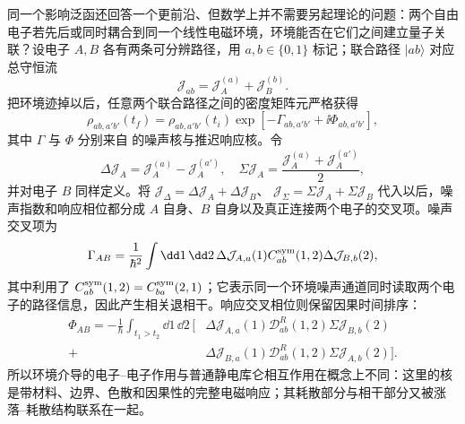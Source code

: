 同一个影响泛函还回答一个更前沿、但数学上并不需要另起理论的问题：两个自由电子若先后或同时耦合到同一个线性电磁环境，环境能否在它们之间建立量子关联？设电子 $A,B$ 各有两条可分辨路径，用 $a,b\in\{0,1\}$ 标记；联合路径 $|ab\rangle$ 对应总守恒流
\begin{equation*}
\mathcal J_{ab}=\mathcal J_A^{(a)}+\mathcal J_B^{(b)}.
\end{equation*}
把环境迹掉以后，任意两个联合路径之间的密度矩阵元严格获得
\begin{equation}
{
\rho_{ab,a'b'}(t_f)
=\rho_{ab,a'b'}(t_i)
\exp\!\left[-\Gamma_{ab,a'b'}+\ii\Phi_{ab,a'b'}\right],}
\label{eq:two_electron_environment_influence_matrix}
\end{equation}
其中 $\Gamma$ 与 $\Phi$ 分别来自 的噪声核与推迟响应核。令
\[
\Delta\mathcal J_A=\mathcal J_A^{(a)}-\mathcal J_A^{(a')},
\quad
\Sigma\mathcal J_A=\frac{\mathcal J_A^{(a)}+\mathcal J_A^{(a')}}2,
\]
并对电子 $B$ 同样定义。将
$\mathcal J_\Delta=\Delta\mathcal J_A+\Delta\mathcal J_B$、
$\mathcal J_\Sigma=\Sigma\mathcal J_A+\Sigma\mathcal J_B$
代入以后，噪声指数和响应相位都分成 $A$ 自身、$B$ 自身以及真正连接两个电子的交叉项。噪声交叉项为
\begin{equation}
{
\Gamma_{AB}
=\frac1{\hbar^2}
\int\dd1\,\dd2\,
\Delta\mathcal J_{A,a}(1)
C_{ab}^{\rm sym}(1,2)
\Delta\mathcal J_{B,b}(2),}
\label{eq:two_electron_cross_decoherence_kernel}
\end{equation}
其中利用了 $C_{ab}^{\rm sym}(1,2)=C_{ba}^{\rm sym}(2,1)$；它表示同一个环境噪声通道同时读取两个电子的路径信息，因此产生相关退相干。响应交叉相位则保留因果时间排序：
\begin{equation}
{
\begin{aligned}
\Phi_{AB}
=-\frac1\hbar
\int_{t_1>t_2}\dd1\,\dd2\,
\Big[&\Delta\mathcal J_{A,a}(1)
\mathcal D^R_{ab}(1,2)
\Sigma\mathcal J_{B,b}(2)\\
+&\Delta\mathcal J_{B,a}(1)
\mathcal D^R_{ab}(1,2)
\Sigma\mathcal J_{A,b}(2)\Big].
\end{aligned}}
\label{eq:two_electron_retarded_cross_phase}
\end{equation}
所以环境介导的电子--电子作用与普通静电库仑相互作用在概念上不同：这里的核是带材料、边界、色散和因果性的完整电磁响应；其耗散部分与相干部分又被涨落--耗散结构联系在一起。

